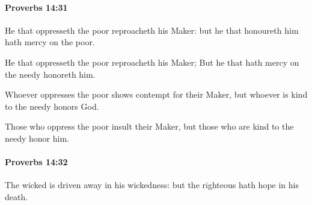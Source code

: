 		\paragraph{Proverbs 14:31} %
			\label{PROVERBS-14-31}

			He that oppresseth the poor reproacheth his Maker: but he that honoureth him hath mercy on the poor.

			\begin{versebox}
					\item[BHS] 
					\item[ASV] He that oppresseth the poor reproacheth his Maker; But he that hath mercy on the needy honoreth him.
					\item[NIV] Whoever oppresses the poor shows contempt for their Maker, but whoever is kind to the needy honors God.
					\item[NRSV] Those who oppress the poor insult their Maker, but those who are kind to the needy honor him.
			\end{versebox}

		\paragraph{Proverbs 14:32} %
			\label{PROVERBS-14-32}

			The wicked is driven away in his wickedness: but the righteous hath hope in his death.

